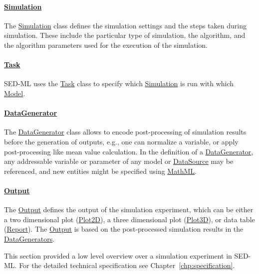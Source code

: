 \paragraph*{\hyperref[class:simulation]{Simulation}}
The \hyperref[class:simulation]{Simulation} class defines the simulation settings and the steps taken during simulation. These include the particular type of simulation, the algorithm, and the algorithm parameters used for the execution of the simulation.

\paragraph*{\hyperref[class:task]{Task}}
SED-ML uses the \hyperref[class:task]{Task} class to specify which \hyperref[class:simulation]{Simulation} is run with which \hyperref[class:model]{Model}.

\paragraph*{\hyperref[class:dataGenerator]{DataGenerator}}
The \hyperref[class:dataGenerator]{DataGenerator} class allows to encode post-processing of simulation results before the generation of outputs, e.g., one can normalize a variable, or apply post-processing like mean value calculation. In the definition of a \hyperref[class:dataGenerator]{DataGenerator}, any addressable variable or parameter of any model or \hyperref[class:dataSource]{DataSource} may be referenced, and new entities might be specified using \hyperref[sec:mathML]{MathML}.

\paragraph*{\hyperref[class:output]{Output}}
The \hyperref[class:output]{Output} defines the output of the simulation experiment, which can be either a two dimensional plot (\hyperref[class:plot2D]{Plot2D}), a three dimensional plot (\hyperref[class:plot3D]{Plot3D}), or data table (\hyperref[class:report]{Report}). The \hyperref[class:output]{Output} is based on the post-processed simulation results in the \hyperref[class:dataGenerator]{DataGenerators}.

This section provided a low level overview over a simulation experiment in SED-ML. For the detailed technical specification see Chapter~\ref{chp:specification}. 

